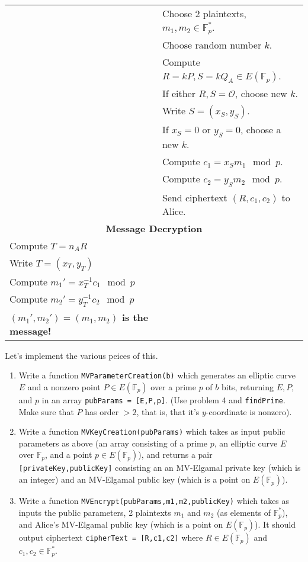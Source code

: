 \documentclass[11pt]{article}
\newcommand{\bF}{\mathbb{F}}
\newcommand{\cO}{\mathcal{O}}
\begin{document}
\begin{enumerate}
{\begin{center}
\begin{tabular}{|l|l|}
      \hline
      &Choose 2 plaintexts, $m_1,m_2\in\bF_p^*$.\\
      &Choose random number $k$.\\
      &Compute $R = kP,S=kQ_A\in E(\bF_p)$.\\
      &If either $R,S=\cO$, choose new $k$.\\
      &Write $S = (x_S,y_S)$.\\
      &If $x_S=0$ or $y_S=0$, choose a new $k$.\\
      &Compute $c_1 = x_Sm_1\mod p.$\\
      &Compute $c_2 = y_Sm_2\mod p.$\\
      &Send ciphertext $(R,c_1,c_2)$ to Alice.\\
      \hline
      \multicolumn{2}{|c|}{\textbf{Message Decryption}}\\
      \hline
      Compute $T = n_AR$ & \\
      Write $T = (x_T,y_T)$ & \\
      Compute $m_1' = x_T^{-1}c_1\mod p$ & \\
      Compute $m_2' = y_T^{-1}c_2\mod p$ & \\
      \textbf{$(m_1',m_2')=(m_1,m_2)$ is the message!} &\\
      \hline
    \end{tabular}
  \end{center}
  Let's implement the various peices of this.
  \begin{enumerate}
    \item{
    Write a function \verb|MVParameterCreation(b)| which generates an elliptic curve $E$ and a nonzero point $P\in E(\bF_p)$ over a prime $p$ of $b$ bits, returning $E,P$, and $p$ in an array \verb|pubParams = [E,P,p]|.  (Use problem 4 and \verb|findPrime|.  Make sure that $P$ has order $>2$, that is, that it's $y$-coordinate is nonzero).
    }
    \item{
    Write a function \verb|MVKeyCreation(pubParams)| which takes as input public parameters as above (an array consisting of a prime $p$, an elliptic curve $E$ over $\bF_p$, and a point $p\in E(\bF_p)$), and returns a pair \verb|[privateKey,publicKey]| consisting an an MV-Elgamal private key (which is an integer) and an MV-Elgamal public key (which is a point on $E(\bF_p)$).
    }
    \item{
    Write a function \verb|MVEncrypt(pubParams,m1,m2,publicKey)| which takes as inputs the public parameters, 2 plaintexts $m_1$ and $m_2$ (as elements of $\bF_p^*$), and Alice's MV-Elgamal public key (which is a point on $E(\bF_p)$).  It should output ciphertext \verb|cipherText = [R,c1,c2]| where $R\in E(\bF_p)$ and $c_1,c_2\in\bF_p^*$.
}
\end{enumerate}}
\end{enumerate}
\end{document}
